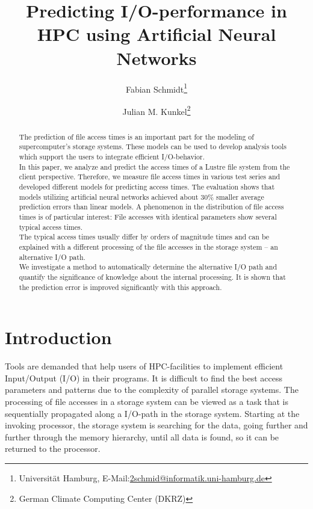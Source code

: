 \documentclass{superfri}
\begin{document}
\author{Fabian Schmidt\footnote{\label{susu}Universität Hamburg, E-Mail:\url{2schmid@informatik.uni-hamburg.de}} \and Julian M. Kunkel\footnote{German Climate Computing Center (DKRZ)}}

\title{Predicting I/O-performance in HPC using Artificial Neural Networks}

\maketitle{}

\begin{abstract} %
	
The prediction of file access times is an important part for the modeling of supercomputer's storage systems. 
These models can be used to develop analysis tools which support the users to integrate efficient I/O-behavior.\\
In this paper, we analyze and predict the access times of a Lustre file system from the client perspective.
Therefore, we measure file access times in various test series and developed different models for predicting access times. 
The evaluation shows that models utilizing artificial neural networks achieved about 30\% smaller average prediction errors than linear models. 
A phenomenon in the distribution of file access times is of particular interest:
File accesses with identical parameters show several typical access times.\\
The typical access times usually differ by orders of magnitude times and can be explained with a different processing of the file accesses in the storage system -- an alternative I/O path.\\
We investigate a method to automatically determine the alternative I/O path and quantify the significance of knowledge about the internal processing.
It is shown that the prediction error is improved significantly with this approach.

\end{abstract}

\section*{Introduction} %
\label{sec:intro}

Tools are demanded that help users of HPC-facilities to implement efficient Input/Output (I/O) in their programs.
It is difficult to find the best access parameters and patterns due to the complexity of parallel storage systems.
The processing of file accesses in a storage system can be viewed as a task that is sequentially propagated along a I/O-path in the storage system.
Starting at the invoking processor, the storage system is searching for the data, going further and further through the memory hierarchy, until all data is found, so it can be returned to the processor.
\end{document}
